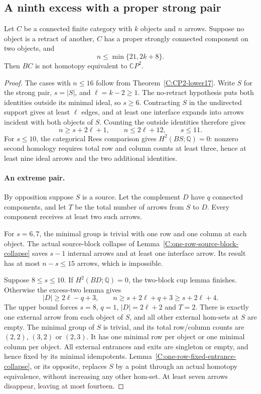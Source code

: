 \subsection{A ninth excess with a proper strong pair}

\begin{proposition}\label{C:strong-pair-excess-nine-through21}
Let $C$ be a connected finite category with $k$ objects and $n$ arrows.
Suppose no object is a retract of another, $C$ has a proper strongly
connected component on two objects, and
\[
 n\leq\min\{21,2k+8\}.
\]
Then $BC$ is not homotopy equivalent to $\mathbb CP^2$.
\end{proposition}
\begin{proof}
The cases with $n\leq16$ follow from Theorem~\ref{C:CP2-lower17}.
Write $S$ for the strong pair, $s=|S|$, and $\ell=k-2\geq1$.
The no-retract hypothesis puts both identities outside its minimal
ideal, so $s\geq6$. Contracting $S$ in the undirected support gives
at least $\ell$ edges, and at least one interface expands into
arrows incident with both objects of $S$. Counting the outside
identities therefore gives
\[
 n\geq s+2\ell+1,\qquad n\leq2\ell+12,\qquad s\leq11.
\]
For $s\leq10$, the categorical Rees comparison gives
$H^2(BS;\mathbb Q)=0$: nonzero second homology requires total
row and column counts at least three, hence at least nine ideal
arrows and the two additional identities.

\paragraph{An extreme pair.}
By opposition suppose $S$ is a source. Let the complement $D$ have
$q$ connected components, and let $T$ be the total number of arrows
from $S$ to $D$. Every component receives at least two such arrows.

For $s=6,7$, the minimal group is trivial with one row and one
column at each object. The actual source-block collapse of
Lemma~\ref{C:one-row-source-block-collapse} saves $s-1$ internal
arrows and at least one interface arrow. Its result has at most
$n-s\leq15$ arrows, which is impossible.

Suppose $8\leq s\leq10$. If $H^2(BD;\mathbb Q)=0$, the
two-block cup lemma finishes. Otherwise the excess-two lemma gives
\[
 |D|\geq2\ell-q+3,\qquad
 n\geq s+2\ell+q+3\geq s+2\ell+4.
\]
The upper bound forces $s=8$, $q=1$, $|D|=2\ell+2$ and $T=2$.
There is exactly one external arrow from each object of $S$, and
all other external hom-sets at $S$ are empty. The minimal group of
$S$ is trivial, and its total row/column counts are $(2,2)$,
$(3,2)$ or $(2,3)$. It has one minimal row per object or one
minimal column per object. All external entrances and exits are
singleton or empty, and hence fixed by its minimal idempotents.
Lemma~\ref{C:one-row-fixed-entrance-collapse}, or its opposite,
replaces $S$ by a point through an actual homotopy equivalence,
without increasing any other hom-set. At least seven arrows
disappear, leaving at most fourteen.


\end{proof}
